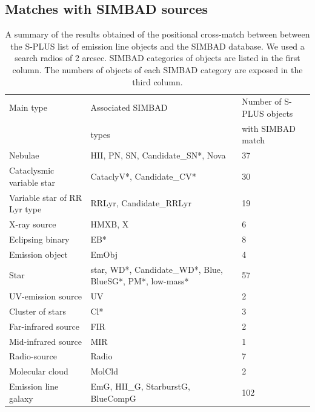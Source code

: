 \documentclass[fleqn,usenatbib]{mnras}
\begin{document}
\subsection{Matches with SIMBAD sources}

\begin{table}
\centering
\caption{A summary of the results obtained of the positional cross-match between
        between the S-PLUS list of emission line objects and the SIMBAD database.
        We used a search radios of 2 arcsec. SIMBAD categories of
        objects are listed in the first column. The numbers of objects of each SIMBAD 
        category are exposed in the third column.}
\label{tab:simbad-sources}
\begin{tabular}{lll} %
  \hline
Main type    & Associated SIMBAD           & Number of S-PLUS objects    \\
             & types                        &  with SIMBAD match         \\
\hline
Nebulae                & HII, PN, SN, Candidate\_SN*, Nova  & 37               \\
Cataclysmic variable star  & CataclyV*, Candidate\_CV* & 30              \\
Variable star of RR Lyr type & RRLyr, Candidate\_RRLyr & 19              \\
X-ray source                & HMXB, X                  & 6               \\
Eclipsing binary            & EB*                    & 8                 \\            
Emission object             & EmObj                  & 4                 \\
Star                        & star, WD*, Candidate\_WD*, Blue, BlueSG*, PM*, low-mass* & 57 \\
UV-emission source          & UV                     & 2                 \\
Cluster of stars            & Cl*                    & 3                 \\
Far-infrared source         & FIR                    & 2                 \\
Mid-infrared source         & MIR                    & 1                 \\
Radio-source                & Radio                  & 7                \\
Molecular cloud             & MolCld                 & 2                 \\
Emission line galaxy        & EmG, HII\_G, StarburstG, BlueCompG & 102   \\

\end{tabular}
\end{table}
\end{document}
